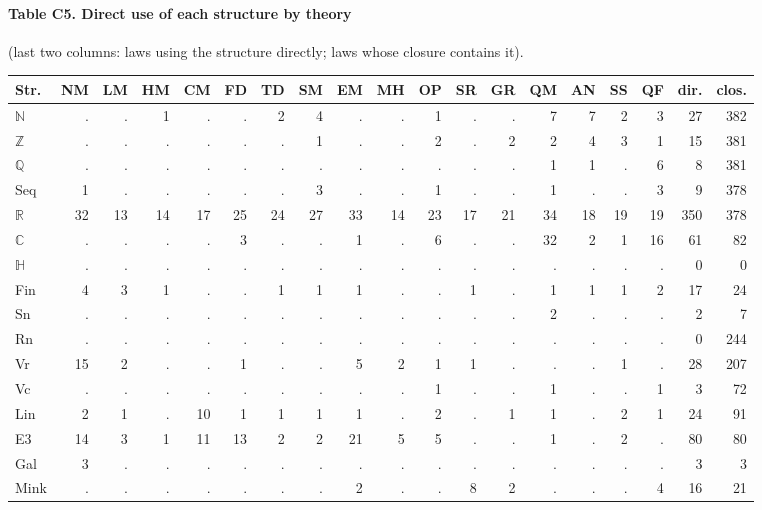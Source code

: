 \paragraph{Table C5. Direct use of each structure by theory} (last two columns: laws using the structure directly; laws whose closure contains it).
{\scriptsize\setlength{\tabcolsep}{3pt}
\begin{longtable}{l r r r r r r r r r r r r r r r r r r}
\toprule
Str. & NM & LM & HM & CM & FD & TD & SM & EM & MH & OP & SR & GR & QM & AN & SS & QF & dir. & clos. \\
\midrule
\endhead
\bottomrule\endfoot
$\mathbb N$ & . & . & 1 & . & . & 2 & 4 & . & . & 1 & . & . & 7 & 7 & 2 & 3 & 27 & 382 \\
$\mathbb Z$ & . & . & . & . & . & . & 1 & . & . & 2 & . & 2 & 2 & 4 & 3 & 1 & 15 & 381 \\
$\mathbb Q$ & . & . & . & . & . & . & . & . & . & . & . & . & 1 & 1 & . & 6 & 8 & 381 \\
\textsf{Seq} & 1 & . & . & . & . & . & 3 & . & . & 1 & . & . & 1 & . & . & 3 & 9 & 378 \\
$\mathbb R$ & 32 & 13 & 14 & 17 & 25 & 24 & 27 & 33 & 14 & 23 & 17 & 21 & 34 & 18 & 19 & 19 & 350 & 378 \\
$\mathbb C$ & . & . & . & . & 3 & . & . & 1 & . & 6 & . & . & 32 & 2 & 1 & 16 & 61 & 82 \\
$\mathbb H$ & . & . & . & . & . & . & . & . & . & . & . & . & . & . & . & . & 0 & 0 \\
\textsf{Fin} & 4 & 3 & 1 & . & . & 1 & 1 & 1 & . & . & 1 & . & 1 & 1 & 1 & 2 & 17 & 24 \\
\textsf{Sn} & . & . & . & . & . & . & . & . & . & . & . & . & 2 & . & . & . & 2 & 7 \\
\textsf{Rn} & . & . & . & . & . & . & . & . & . & . & . & . & . & . & . & . & 0 & 244 \\
\textsf{Vr} & 15 & 2 & . & . & 1 & . & . & 5 & 2 & 1 & 1 & . & . & . & 1 & . & 28 & 207 \\
\textsf{Vc} & . & . & . & . & . & . & . & . & . & 1 & . & . & 1 & . & . & 1 & 3 & 72 \\
\textsf{Lin} & 2 & 1 & . & 10 & 1 & 1 & 1 & 1 & . & 2 & . & 1 & 1 & . & 2 & 1 & 24 & 91 \\
\textsf{E3} & 14 & 3 & 1 & 11 & 13 & 2 & 2 & 21 & 5 & 5 & . & . & 1 & . & 2 & . & 80 & 80 \\
\textsf{Gal} & 3 & . & . & . & . & . & . & . & . & . & . & . & . & . & . & . & 3 & 3 \\
\textsf{Mink} & . & . & . & . & . & . & . & 2 & . & . & 8 & 2 & . & . & . & 4 & 16 & 21 \\

\end{longtable}}
